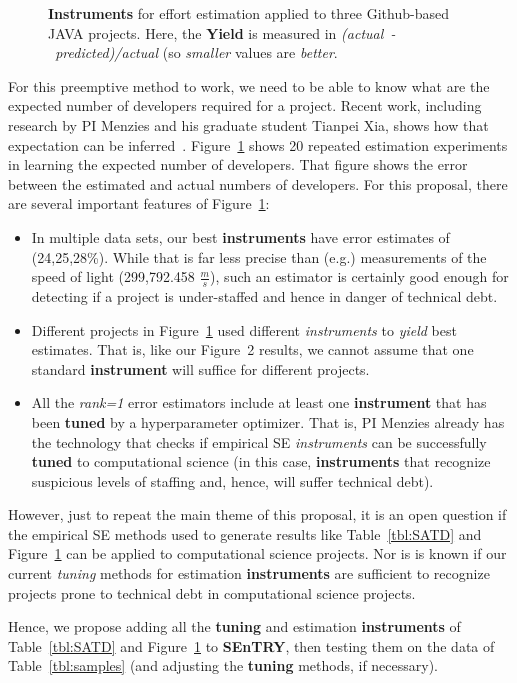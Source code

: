 \documentclass{NSF}
\newenvironment{myitemize}
{ \begin{itemize}
    \setlength{\itemsep}{0pt}
    \setlength{\parskip}{0pt}
    \setlength{\parsep}{0pt}     }
{ \end{itemize}                  }
\newcommand{\bi}{\begin{myitemize}}
\newcommand{\ei}{\end{myitemize}}
\newcommand{\tbl}[1]{Table~\ref{tbl:#1}}
\newcommand{\fig}[1]{Figure~\ref{fig:#1}}
\newcommand{\IT}{{\bf {\sffamily SEnTRY}}}
\begin{document}
\begin{nsfdescription}
\begin{figure}[!b]
 \caption{ {\bf Instruments} for effort estimation applied to three Github-based JAVA projects.
 Here, the {\bf Yield} is measured in \mbox{{\em (actual - predicted)/actual}} (so {\em smaller} values are {\em better}.} \label{fig:effort}
 \end{figure} 
 For this preemptive method to work, we need to be able to know 
 what are the expected number of developers required
 for a project.
 Recent work, including research by PI Menzies and his graduate student
Tianpei Xia, shows how that expectation can be inferred~\cite{Robles:2014,QiEffort17,xia19}.
 \fig{effort} shows 20 repeated estimation experiments in learning
 the expected number of developers.   That figure shows the error between
 the estimated and actual numbers of developers.
For this proposal, there are several important features of   \fig{effort}:
\bi
\item
In multiple data sets, our best  {\bf instruments} have error
estimates of (24,25,28\%). While that is far less precise than (e.g.) measurements of the speed of light (299,792.458 $\frac{m}{s}$), such an estimator is certainly good enough for detecting if a project is under-staffed and hence in danger of technical debt.
\item
Different projects in \fig{effort} used different {\em instruments} 
to {\em yield} best estimates. That is, like our Figure~2 results, we cannot assume that one standard  {\bf instrument} will suffice for different projects. 
\item 
All the {\em rank=1} error estimators include at least one {\bf instrument} that has been {\bf tuned} by a hyperparameter  optimizer. That is, PI Menzies   already has the
technology that checks if empirical SE {\em instruments} can be successfully {\bf tuned} to computational science (in this case, {\bf instruments} that   recognize suspicious levels of staffing and, hence,   will  suffer technical debt).
\ei
However, just to repeat the main theme of this proposal,
it is an open question if the empirical SE methods used to generate results like \tbl{SATD} and
\fig{effort} can be applied to computational science projects. Nor is is known
if our current {\em tuning} methods for estimation {\bf instruments}
are sufficient to recognize projects prone to
technical debt in computational science projects.

Hence, we propose adding all the {\bf tuning} and estimation {\bf instruments} of  \tbl{SATD} and \fig{effort} to {\IT}, then testing   them on the data of \tbl{samples}
(and adjusting the {\bf tuning} methods, if necessary).
 



\end{nsfdescription}
\end{document}
